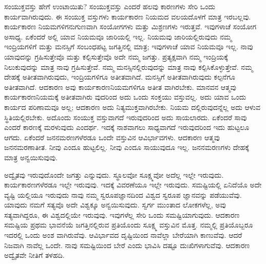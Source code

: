 ಸಂಯುಕ್ತವಸ್ತು ಹೇಗೆ ಉಂಟಾಯಿತು? ಸಂಯುಕ್ತವಸ್ತು ಎಂದರೆ ಹಲವು ಕಾರಣಗಳು ಸೇರಿ ಒಂದು ಕಾರ್ಯವಾಗಿರುವುದು. ಈ ಸಂಯುಕ್ತ ವಸ್ತುಗಳು ಕಾರ್ಯಕಾರಣ ನಿಯಮದ ವಲಯದೊಳಗೆ ಮಾತ್ರ ಇರಬಲ್ಲವು. ಕಾರ್ಯಕಾರಣ ನಿಯಮಗಳಿಗನುಗುಣವಾಗಿ ಸಂಯೋಗಗಳು ಮತ್ತು ಮಿಶ್ರಣಗಳು ಇರುತ್ತವೆ. ಇವುಗಳಾಚೆ ಸಂಯೋಗ ಅಸಾಧ್ಯ. ಏಕೆಂದರೆ ಅಲ್ಲಿ ಯಾವ ನಿಯಮವೂ ಜಾರಿಯಲ್ಲಿ ಇಲ್ಲ. ನಿಯಮವು ಜಾರಿಯಲ್ಲಿರುವುದು ನಮ್ಮ ಇಂದ್ರಿಯಗಳಿಗೆ ಮತ್ತು ಮನಸ್ಸಿಗೆ ಸಂಬಂಧಪಟ್ಟ ಜಗತ್ತಿನಲ್ಲಿ ಮಾತ್ರ; ಇವುಗಳಾಚೆ ಯಾವ ನಿಯಮವೂ ಇಲ್ಲ. ನಾವು ಯಾವುದನ್ನು ಗ್ರಹಿಸುತ್ತೇವೊ ಮತ್ತು ಕಲ್ಪಿಸುತ್ತೇವೊ ಅದೇ ನಮ್ಮ ಜಗತ್ತು. ಪ್ರತ್ಯಕ್ಷವಾಗಿ ನಮ್ಮ ಇಂದ್ರಿಯಕ್ಕೆ ನಿಲುಕುವುದನ್ನು ಮಾತ್ರ ನಾವು ಗ್ರಹಿಸುತ್ತೇವೆ. ನಮ್ಮ ಮನಸ್ಸಿನಲ್ಲಿರುವುದನ್ನು ಮಾತ್ರ ನಾವು ಕಲ್ಪಿಸಿಕೊಳ್ಳುತ್ತೇವೆ. ನಮ್ಮ ದೇಹಕ್ಕೆ ಅತೀತವಾಗಿರುವುದು, ಇಂದ್ರಿಯಗಳಿಗೂ ಅತೀತವಾಗಿದೆ. ಮನಸ್ಸಿಗೆ ಅತೀತವಾಗಿರುವುದು ಕಲ್ಪನೆಗೂ ಅತೀತವಾಗಿದೆ. ಆದಕಾರಣ ಅವು ಕಾರ್ಯಕಾರಣನಿಯಮಗಳಿಗೂ ಅತೀತ ವಾಗಿರಬೇಕು. ಮಾನವನ ಆತ್ಮವು ಕಾರ್ಯಕಾರಣನಿಯಮಕ್ಕೆ ಅತೀತವಾಗಿರು ವುದರಿಂದ ಅದು ಒಂದು ಸಂಕ್ತಯು ವಸ್ತುವಲ್ಲ. ಅದು ಯಾವ ಒಂದು ಕಾರ್ಯದ ಪರಿಣಾಮವೂ ಅಲ್ಲ; ಆದಕಾರಣ ಅದು ನಿತ್ಯಮುಕ್ತವಾಗಿರಬೇಕು. ನಿಯಮ ದಲ್ಲಿರುವುದನ್ನೆಲ್ಲ ಅದು ಆಳುವ ಸ್ಥಿತಿಯಲ್ಲಿರಬೇಕು. ಅದೊಂದು ಸಂಯುಕ್ತ ವಸ್ತುವಾಗದೆ ಇರುವುದರಿಂದ ಅದು ಸಾಯಲಾರದು. ಏಕೆಂದರೆ ಸಾವು ಎಂದರೆ ಕಾರಣಕ್ಕೆ ಮರಳುವುದು ಎಂದರ್ಥ. ಇದಕ್ಕೆ ನಾಶವಾಗಲು ಸಾಧ್ಯವಾಗದೆ ಇರುವುದರಿಂದ ಇದು ಹುಟ್ಟಲೂ ಆಗದು. ಏಕೆಂದರೆ ಜನನಮರಣಗಳೆರಡೂ ಒಂದೇ ವಸ್ತುವಿನ ಆವಿರ್ಭಾವಗಳು. ಆದಕಾರಣ ಆತ್ಮವು ಜನನಮರಣಾತೀತ. ನೀವು ಎಂದೂ ಹುಟ್ಟಲಿಲ್ಲ. ನೀವು ಎಂದೂ ಸಾಯುವುದೂ ಇಲ್ಲ. ಜನನಮರಣಗಳು ದೇಹಕ್ಕೆ ಮಾತ್ರ ಅನ್ವಯಿಸುವುವು.

ಅದ್ವೈತವು ಇರುವುದೊಂದೇ ಜಗತ್ತು ಎನ್ನುವುದು. ಸ್ಥೂಲವೋ ಸೂಕ್ಷ್ಮವೋ ಅದೆಲ್ಲ ಇಲ್ಲೇ ಇರುವುದು. ಕಾರ್ಯಕಾರಣಗಳೆರಡೂ ಇಲ್ಲೇ ಇರುವುವು. ಇದಕ್ಕೆ ವಿವರಣೆಯೂ ಇಲ್ಲೇ ಇರುವುದು. ಸಮಷ್ಟಿಯಲ್ಲಿ ಏನಿದೆಯೊ ಅದೇ ವ್ಯಷ್ಟಿ ಯಲ್ಲಿಯೂ ಇರುವುದು ನಾವು ನಮ್ಮ ಸ್ವರೂಪಜ್ಞಾನದಿಂದ ವಿಶ್ವದ ಸ್ವರೂಪ ಜ್ಞಾನವನ್ನು ಪಡೆಯುವೆವು. ಯಾವುದು ನಮಗೆ ಸತ್ಯವೊ ಅದೇ ವಿಶ್ವಕ್ಕೂ ಅನ್ವಯಿಸುವುದು. ಸ್ವರ್ಗ ಮುಂತಾದ ಲೋಕಗಳೆಲ್ಲ, ಅವು ಸತ್ಯವಾಗಿದ್ದರೂ, ಈ ವಿಶ್ವದಲ್ಲಿಯೇ ಇರುವುವು. ಇವುಗಳೆಲ್ಲ ಸೇರಿ ಒಂದು ಸಮಷ್ಟಿಯಾಗುವುದು. ಆದಕಾರಣ ಸಮಷ್ಟಿಯ ಪ್ರಥಮ ಭಾವನೆಯೆ ಜಗತ್ತಿನಲ್ಲಿರುವ ಪ್ರತಿಯೊಂದು ಸೂಕ್ಷ್ಮ ವಸ್ತುವಿನ ಮೊತ್ತ. ನಮ್ಮಲ್ಲಿ ಪ್ರತಿಯೊಬ್ಬರೂ ಇದರಲ್ಲಿ ಒಂದು ಅಂಶ ವಾಗಿರುವೆವು. ಆವಿರ್ಭಾವದ ದೃಷ್ಟಿಯಿಂದ ನಾವೆಲ್ಲಾ ಬೇರೆಯಾಗಿ ಕಾಣುವೆವು. ಆದರೆ ನಿಜವಾಗಿ ನಾವೆಲ್ಲ ಒಂದೇ. ನಾವು ಸಮಷ್ಟಿಯಿಂದ ಬೇರೆ ಎಂದು ಭಾವಿಸಿ ದಷ್ಟೂ ದುಃಖಿಗಳಾಗುವೆವು. ಆದಕಾರಣ ಅದ್ವೈತವೇ ನೀತಿಗೆ ತಳಹದಿ.

